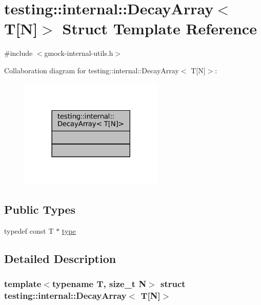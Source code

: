 \hypertarget{structtesting_1_1internal_1_1DecayArray_3_01T[N]_4}{}\section{testing\+:\+:internal\+:\+:Decay\+Array$<$ T\mbox{[}N\mbox{]}$>$ Struct Template Reference}
\label{structtesting_1_1internal_1_1DecayArray_3_01T[N]_4}


{\ttfamily \#include $<$gmock-\/internal-\/utils.\+h$>$}



Collaboration diagram for testing\+:\+:internal\+:\+:Decay\+Array$<$ T\mbox{[}N\mbox{]}$>$\+:
\nopagebreak
\begin{figure}[H]
\begin{center}
\leavevmode
\includegraphics[width=194pt]{structtesting_1_1internal_1_1DecayArray_3_01T[N]_4__coll__graph}
\end{center}
\end{figure}
\subsection*{Public Types}
\begin{DoxyCompactItemize}
\item 
typedef const T $\ast$ \hyperlink{structtesting_1_1internal_1_1DecayArray_3_01T[N]_4_afc22a88da484b94639501c07fb90bfd3}{type}
\end{DoxyCompactItemize}


\subsection{Detailed Description}
\subsubsection*{template$<$typename T, size\+\_\+t N$>$\newline
struct testing\+::internal\+::\+Decay\+Array$<$ T\mbox{[}\+N\mbox{]}$>$}



